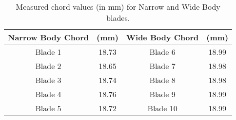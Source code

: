 \begin{table}[H]
    \centering
    \caption{Measured chord values (in mm) for Narrow and Wide Body blades.}
    \begin{tabular}{cccc}
        \hline
        \textbf{Narrow Body Chord} & \textbf{(mm)} & \textbf{Wide Body Chord} & \textbf{(mm)} \\ \hline
        Blade 1 & 18.73 & Blade 6 & 18.99 \\
        Blade 2 & 18.65 & Blade 7 & 18.98 \\
        Blade 3 & 18.74 & Blade 8 & 18.98 \\
        Blade 4 & 18.76 & Blade 9 & 18.99 \\
        Blade 5 & 18.72 & Blade 10 & 18.99 \\ \hline
    \end{tabular}
\end{table}

